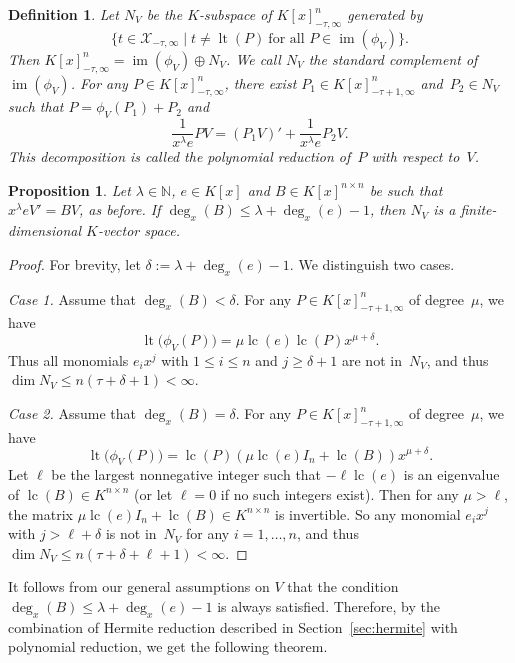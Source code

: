 \documentclass[final,1p,times,authoryear]{elsarticle}
\newtheorem{prop}[theorem]{Proposition}
\newtheorem{defi}[theorem]{Definition}
\newcommand{\cX}{ {\mathcal X}}
\let\set\mathbb
\def\lc{\operatorname{lc}}
\def\lt{\operatorname{lt}}
\def\im{\operatorname{im}}
\begin{document}
\begin{defi}
  Let $N_V$ be the $K$-subspace of $K[x]_{-\tau,\infty}^n$ generated by
\[
  \bigl\{t \in \cX_{-\tau,\infty} \mathrel{|} t \neq \lt(P) \ \text{for all $P\in \im(\phi_V)$}\bigr\}.
\]
Then $K[x]_{-\tau,\infty}^n = \im(\phi_V) \oplus N_V$.
We call $N_V$ the \emph{standard complement} of $\im(\phi_V)$.
For any $P\in K[x]_{-\tau,\infty}^n$, there exist $P_1\in K[x]_{-\tau+1,\infty}^n$ and~$P_2\in N_V$
such that $P=\phi_V(P_1)+P_2$ and
\[
  \frac{1}{x^\lambda e}PV = (P_1V)' + \frac{1}{x^\lambda e}P_2V.
\]
This decomposition is called the \emph{polynomial reduction} of~$P$
with respect to~$V$.
\end{defi}

\begin{prop}\label{PROP:finite}
Let $\lambda\in\set N$, $e\in K[x]$ and $B\in K[x]^{n \times n}$ be such that $x^\lambda eV'=BV$, as before.
If $\deg_x(B) \leq \lambda+\deg_x(e)-1$, then $N_V$ is a finite-dimensional $K$-vector space.
\end{prop}
\begin{proof}
For brevity, let $\delta:=\lambda+\deg_x(e)-1$. We distinguish two cases.

\smallskip
{\it Case 1.}
Assume that $\deg_x(B) < \delta$. For any $P\in K[x]_{-\tau+1,\infty}^n$ of degree~$\mu$, we have
\[
  \lt\bigl(\phi_V(P)\bigr) = \mu\lc(e)\lc(P)x^{\mu+\delta}.
\]
Thus all monomials $e_i x^j$ with $1\leq i\leq n$ and $j\geq \delta+1$ are not in~$N_V$,
and thus $\dim N_V\leq n(\tau+\delta+1)<\infty$.

\smallskip
{\it Case 2.}
Assume that $\deg_x(B)=\delta$. For any $P\in K[x]_{-\tau+1,\infty}^n$ of degree~$\mu$, we have
\[
  \lt\bigl(\phi_V(P)\bigr) = \lc(P)(\mu\lc(e)I_n + \lc(B))x^{\mu+\delta}.
\]
Let $\ell$ be the largest nonnegative integer such that $-\ell \lc(e)$ is an
eigenvalue of $\lc(B)\in K^{n\times n}$ (or let $\ell=0$ if no such integers exist).
Then for any $\mu>\ell$, the matrix $\mu\lc(e)I_n + \lc(B)\in K^{n\times n}$ is invertible.
So any monomial $e_ix^j$ with $j> \ell+\delta$ is not in~$N_V$ for any $i=1, \ldots, n$,
and thus $\dim N_V\leq n(\tau+\delta+\ell+1)<\infty$.
\end{proof}

It follows from our general assumptions on $V$ that the
condition $\deg_x(B) \leq \lambda+\deg_x(e)-1$ is always satisfied.
Therefore, by the combination of Hermite reduction described in Section~\ref{sec:hermite}
with polynomial reduction, we get the following theorem.
\end{document}
